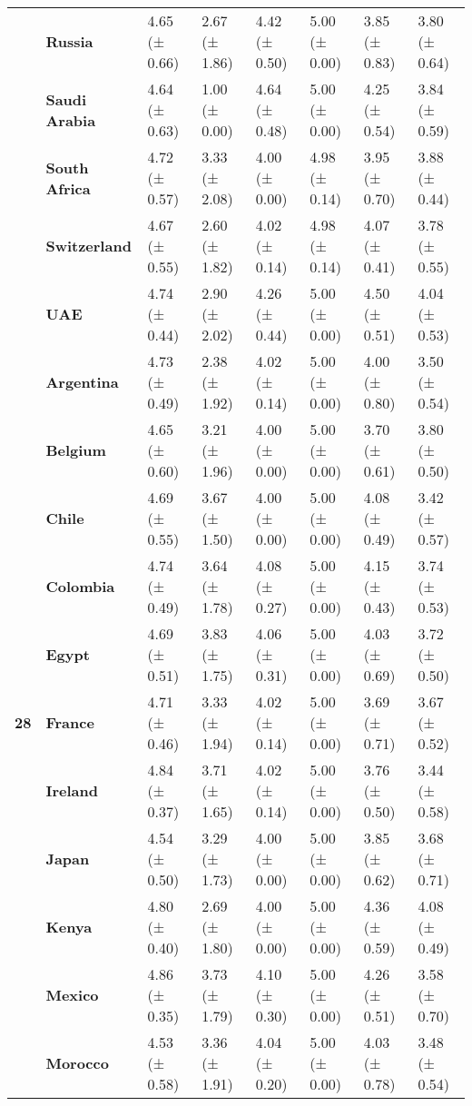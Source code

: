 \begin{longtable}{llllllll}
\textbf{} & \textbf{Russia} & 4.65 (± 0.66) & 2.67 (± 1.86) & 4.42 (± 0.50) & 5.00 (± 0.00) & 3.85 (± 0.83) & 3.80 (± 0.64) \\
\textbf{} & \textbf{Saudi Arabia} & 4.64 (± 0.63) & 1.00 (± 0.00) & 4.64 (± 0.48) & 5.00 (± 0.00) & 4.25 (± 0.54) & 3.84 (± 0.59) \\
\textbf{} & \textbf{South Africa} & 4.72 (± 0.57) & 3.33 (± 2.08) & 4.00 (± 0.00) & 4.98 (± 0.14) & 3.95 (± 0.70) & 3.88 (± 0.44) \\
\textbf{} & \textbf{Switzerland} & 4.67 (± 0.55) & 2.60 (± 1.82) & 4.02 (± 0.14) & 4.98 (± 0.14) & 4.07 (± 0.41) & 3.78 (± 0.55) \\
\textbf{} & \textbf{UAE} & 4.74 (± 0.44) & 2.90 (± 2.02) & 4.26 (± 0.44) & 5.00 (± 0.00) & 4.50 (± 0.51) & 4.04 (± 0.53) \\
\cline{1-8}
\multirow[t]{19}{*}{\textbf{28}} & \textbf{Argentina} & 4.73 (± 0.49) & 2.38 (± 1.92) & 4.02 (± 0.14) & 5.00 (± 0.00) & 4.00 (± 0.80) & 3.50 (± 0.54) \\
\textbf{} & \textbf{Belgium} & 4.65 (± 0.60) & 3.21 (± 1.96) & 4.00 (± 0.00) & 5.00 (± 0.00) & 3.70 (± 0.61) & 3.80 (± 0.50) \\
\textbf{} & \textbf{Chile} & 4.69 (± 0.55) & 3.67 (± 1.50) & 4.00 (± 0.00) & 5.00 (± 0.00) & 4.08 (± 0.49) & 3.42 (± 0.57) \\
\textbf{} & \textbf{Colombia} & 4.74 (± 0.49) & 3.64 (± 1.78) & 4.08 (± 0.27) & 5.00 (± 0.00) & 4.15 (± 0.43) & 3.74 (± 0.53) \\
\textbf{} & \textbf{Egypt} & 4.69 (± 0.51) & 3.83 (± 1.75) & 4.06 (± 0.31) & 5.00 (± 0.00) & 4.03 (± 0.69) & 3.72 (± 0.50) \\
\textbf{} & \textbf{France} & 4.71 (± 0.46) & 3.33 (± 1.94) & 4.02 (± 0.14) & 5.00 (± 0.00) & 3.69 (± 0.71) & 3.67 (± 0.52) \\
\textbf{} & \textbf{Ireland} & 4.84 (± 0.37) & 3.71 (± 1.65) & 4.02 (± 0.14) & 5.00 (± 0.00) & 3.76 (± 0.50) & 3.44 (± 0.58) \\
\textbf{} & \textbf{Japan} & 4.54 (± 0.50) & 3.29 (± 1.73) & 4.00 (± 0.00) & 5.00 (± 0.00) & 3.85 (± 0.62) & 3.68 (± 0.71) \\
\textbf{} & \textbf{Kenya} & 4.80 (± 0.40) & 2.69 (± 1.80) & 4.00 (± 0.00) & 5.00 (± 0.00) & 4.36 (± 0.59) & 4.08 (± 0.49) \\
\textbf{} & \textbf{Mexico} & 4.86 (± 0.35) & 3.73 (± 1.79) & 4.10 (± 0.30) & 5.00 (± 0.00) & 4.26 (± 0.51) & 3.58 (± 0.70) \\
\textbf{} & \textbf{Morocco} & 4.53 (± 0.58) & 3.36 (± 1.91) & 4.04 (± 0.20) & 5.00 (± 0.00) & 4.03 (± 0.78) & 3.48 (± 0.54) \\

\end{longtable}
